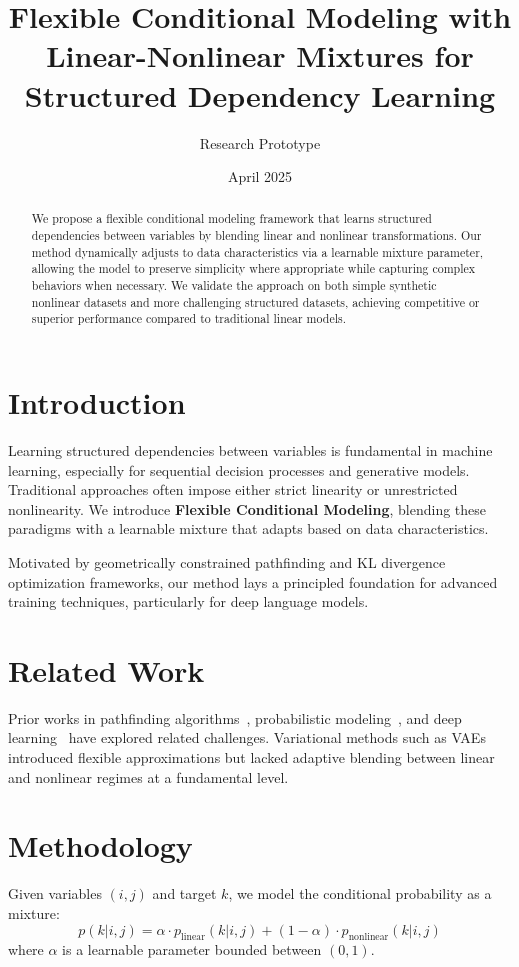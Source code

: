 \documentclass[11pt]{article}
\title{Flexible Conditional Modeling with Linear-Nonlinear Mixtures for Structured Dependency Learning}
\author{Research Prototype}
\date{April 2025}
\begin{document}
\maketitle

\begin{abstract}
We propose a flexible conditional modeling framework that learns structured dependencies between variables by blending linear and nonlinear transformations. Our method dynamically adjusts to data characteristics via a learnable mixture parameter, allowing the model to preserve simplicity where appropriate while capturing complex behaviors when necessary. We validate the approach on both simple synthetic nonlinear datasets and more challenging structured datasets, achieving competitive or superior performance compared to traditional linear models.
\end{abstract}

\section{Introduction}
Learning structured dependencies between variables is fundamental in machine learning, especially for sequential decision processes and generative models. Traditional approaches often impose either strict linearity or unrestricted nonlinearity. We introduce \textbf{Flexible Conditional Modeling}, blending these paradigms with a learnable mixture that adapts based on data characteristics.

Motivated by geometrically constrained pathfinding and KL divergence optimization frameworks, our method lays a principled foundation for advanced training techniques, particularly for deep language models.

\section{Related Work}
\label{sec:related}
Prior works in pathfinding algorithms~\cite{lavalle2006planning}, probabilistic modeling~\cite{cover2006elements}, and deep learning~\cite{goodfellow2016deep} have explored related challenges. Variational methods such as VAEs~\cite{kingma2014auto} introduced flexible approximations but lacked adaptive blending between linear and nonlinear regimes at a fundamental level.

\section{Methodology}
Given variables $(i, j)$ and target $k$, we model the conditional probability as a mixture:
\begin{equation}
    p(k|i,j) = \alpha \cdot p_{\text{linear}}(k|i,j) + (1-\alpha) \cdot p_{\text{nonlinear}}(k|i,j)
\end{equation}
where $\alpha$ is a learnable parameter bounded between $(0,1)$.
\end{document}
